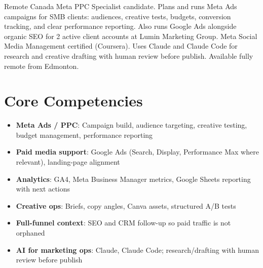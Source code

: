 \documentclass[11pt,a4paper,sans]{moderncv}
\begin{document}
\makecvtitle

\vspace{6pt}
\small{Remote Canada Meta PPC Specialist candidate. Plans and runs Meta Ads campaigns for SMB clients: audiences, creative tests, budgets, conversion tracking, and clear performance reporting. Also runs Google Ads alongside organic SEO for 2 active client accounts at Lumin Marketing Group. Meta Social Media Management certified (Coursera). Uses Claude and Claude Code for research and creative drafting with human review before publish. Available fully remote from Edmonton.}

\section{Core Competencies}
\vspace{1pt}
\begin{itemize}
\item \textbf{Meta Ads / PPC}: Campaign build, audience targeting, creative testing, budget management, performance reporting
\item \textbf{Paid media support}: Google Ads (Search, Display, Performance Max where relevant), landing-page alignment
\item \textbf{Analytics}: GA4, Meta Business Manager metrics, Google Sheets reporting with next actions
\item \textbf{Creative ops}: Briefs, copy angles, Canva assets, structured A/B tests
\item \textbf{Full-funnel context}: SEO and CRM follow-up so paid traffic is not orphaned
\item \textbf{AI for marketing ops}: Claude, Claude Code; research/drafting with human review before publish
\end{itemize}
\end{document}
